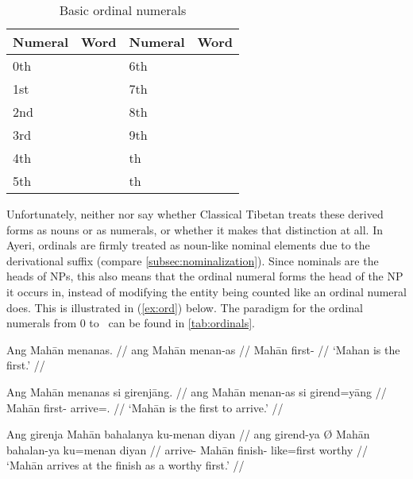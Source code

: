 \begin{table}[tp]\centering
\caption{Basic ordinal numerals}
\begin{tabu} to .75\linewidth {X[c] X[c] X[c] X[c]}
\toprule\tableheaderfont
Numeral
	& Word
	& Numeral
	& Word
	\\
\toprule

0th
	& 
	& 6th
	& 
	\\

1st
	& 
	& 7th
	& 
	\\
	
2nd
	& 
	& 8th
	& 
	\\
	
3rd
	& 
	& 9th
	& 
	\\

4th
	& 
	& \ten{}th
	& 
	\\

5th
	& 
	& \elv{}th
	& 
	\\

\bottomrule
\end{tabu}
\label{tab:ordinals}
\end{table}

Unfortunately, neither \citet{chungetal2014} nor \citet{beyer1992} say whether
Classical Tibetan treats these derived forms as nouns or as numerals, or
whether it makes that distinction at all. In Ayeri, ordinals are firmly treated
as noun-like nominal elements due to the derivational suffix
 (compare \autoref{subsec:nominalization}). Since nominals are
the heads of NPs, this also means that the ordinal numeral forms the head of
the NP it occurs in, instead of modifying the entity being counted like an
ordinal numeral does. This is illustrated in (\ref{ex:ord}) below. The paradigm
for the ordinal numerals from 0 to \elv\ can be found in
\autoref{tab:ordinals}.

\pex\label{ex:ord}
\a\label{ex:ordanaph}\begingl
	\gla Ang Mahān menanas. //
	\glb ang Mahān menan-as //
	\glc \Aarg{} Mahān first-\Parg{} //
	\glft `Mahan is the first.' //
\endgl

\a\label{ex:ordrel}\begingl
	\gla Ang Mahān menanas si girenjāng. //
	\glb ang Mahān menan-as si girend=yāng //
	\glc \Aarg{} Mahān first-\Parg{} \Rel{} arrive=\TsgM{}.\Aarg{} //
	\glft `Mahān is the first to arrive.' //
\endgl

\a\label{ex:ordadj}\begingl
	\gla Ang girenja {} Mahān bahalanya ku-menan diyan //
	\glb ang girend-ya Ø Mahān bahalan-ya ku=menan diyan //
	\glc \Aarg{} arrive-\TsgM{} \Top{} Mahān finish-\Loc{} like=first 
		worthy //
	\glft `Mahān arrives at the finish as a worthy first.' //
\endgl

